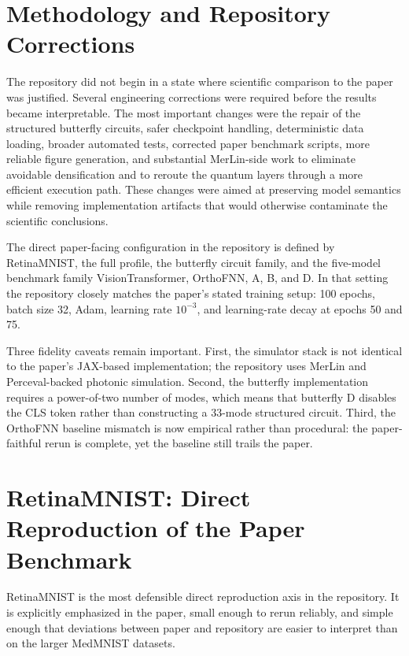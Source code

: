 \documentclass[11pt,a4paper]{article}
\def\texttt#1{#1}%
\begin{document}
\section{Methodology and Repository Corrections}

The repository did not begin in a state where scientific comparison to the paper was justified. Several engineering corrections were required before the results became interpretable. The most important changes were the repair of the structured butterfly circuits, safer checkpoint handling, deterministic data loading, broader automated tests, corrected paper benchmark scripts, more reliable figure generation, and substantial MerLin-side work to eliminate avoidable densification and to reroute the quantum layers through a more efficient execution path. These changes were aimed at preserving model semantics while removing implementation artifacts that would otherwise contaminate the scientific conclusions.

The direct paper-facing configuration in the repository is defined by RetinaMNIST, the \texttt{full} profile, the \texttt{butterfly} circuit family, and the five-model benchmark family \texttt{VisionTransformer}, \texttt{OrthoFNN}, \texttt{A}, \texttt{B}, and \texttt{D}. In that setting the repository closely matches the paper's stated training setup: 100 epochs, batch size 32, Adam, learning rate \(10^{-3}\), and learning-rate decay at epochs 50 and 75.

Three fidelity caveats remain important. First, the simulator stack is not identical to the paper's JAX-based implementation; the repository uses MerLin and Perceval-backed photonic simulation. Second, the butterfly implementation requires a power-of-two number of modes, which means that butterfly \texttt{D} disables the CLS token rather than constructing a 33-mode structured circuit. Third, the \texttt{OrthoFNN} baseline mismatch is now empirical rather than procedural: the paper-faithful rerun is complete, yet the baseline still trails the paper.

\section{RetinaMNIST: Direct Reproduction of the Paper Benchmark}

RetinaMNIST is the most defensible direct reproduction axis in the repository. It is explicitly emphasized in the paper, small enough to rerun reliably, and simple enough that deviations between paper and repository are easier to interpret than on the larger MedMNIST datasets.
\end{document}
